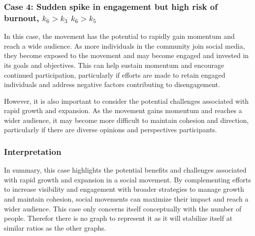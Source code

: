 \documentclass{article}
\begin{document}
    \subsubsection*{Case 4: Sudden spike in engagement but high risk of burnout, $k_6 > k_3$  $k_6 > k_5$}
    \begin{tcolorbox}
   In this case, the movement has the potential to rapidly gain momentum and reach a wide audience. As more individuals in the community join social media, they become exposed to the movement and may become engaged and invested in its goals and objectives. This can help sustain momentum and encourage continued participation, particularly if efforts are made to retain engaged individuals and address negative factors contributing to disengagement. 
   
   However, it is also important to consider the potential challenges associated with rapid growth and expansion. As the movement gains momentum and reaches a wider audience, it may become more difficult to maintain cohesion and direction, particularly if there are diverse opinions and perspectives  participants.
    \subsubsection*{Interpretation} In summary,  this case highlights the potential benefits and challenges associated with rapid growth and expansion in a social movement. By complementing efforts to increase visibility and engagement with broader strategies to manage growth and maintain cohesion, social movements can maximize their impact and reach a wider audience.
    This case only concerns itself conceptually with the number of people. Therefor there is no graph to represent it as it will stabilize itself at similar ratios as the other graphs.
    \end{tcolorbox}
\end{document}
